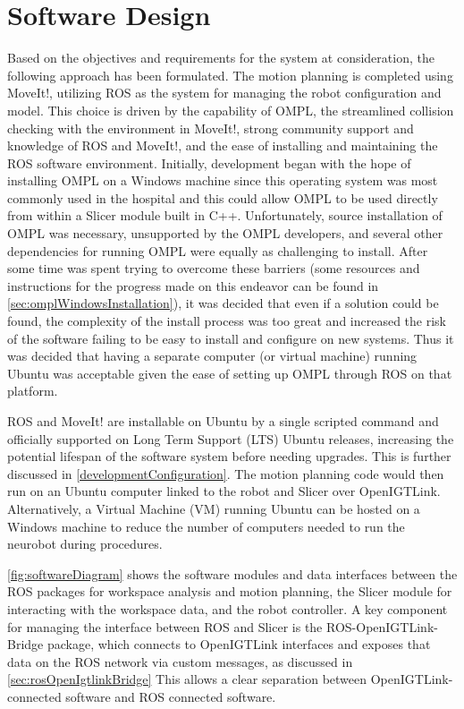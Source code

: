 \documentclass[12pt]{report}
\begin{document}
\section{Software Design}
Based on the objectives and requirements for the system at consideration, the following approach has been formulated. The motion planning is completed using MoveIt!, utilizing ROS as the system for managing the robot configuration and model. This choice is driven by the capability of OMPL, the streamlined collision checking with the environment in MoveIt!, strong community support and knowledge of ROS and MoveIt!, and the ease of installing and maintaining the ROS software environment. Initially, development began with the hope of installing OMPL on a Windows machine since this operating system was most commonly used in the hospital and this could allow OMPL to be used directly from within a Slicer module built in C++. Unfortunately, source installation of OMPL was necessary, unsupported by the OMPL developers, and several other dependencies for running OMPL were equally as challenging to install. After some time was spent trying to overcome these barriers (some resources and instructions for the progress made on this endeavor can be found in \autoref{sec:omplWindowsInstallation}), it was decided that even if a solution could be found, the complexity of the install process was too great and increased the risk of the software failing to be easy to install and configure on new systems. Thus it was decided that having a separate computer (or virtual machine) running Ubuntu was acceptable given the ease of setting up OMPL through ROS on that platform. 

ROS and MoveIt! are installable on Ubuntu by a single scripted command and officially supported on Long Term Support (LTS) Ubuntu releases, increasing the potential lifespan of the software system before needing upgrades. This is further discussed in \autoref{developmentConfiguration}. The motion planning code would then run on an Ubuntu computer linked to the robot and Slicer over OpenIGTLink. Alternatively, a Virtual Machine (VM) running Ubuntu can be hosted on a Windows machine to reduce the number of computers needed to run the neurobot during procedures.

\autoref{fig:softwareDiagram} shows the software modules and data interfaces between the ROS packages for workspace analysis and motion planning, the Slicer module for interacting with the workspace data, and the robot controller. A key component for managing the interface between ROS and Slicer is the ROS-OpenIGTLink-Bridge package, which connects to OpenIGTLink interfaces and exposes that data on the ROS network via custom messages, as discussed in \autoref{sec:rosOpenIgtlinkBridge} This allows a clear separation between OpenIGTLink-connected software and ROS connected software.
\end{document}
